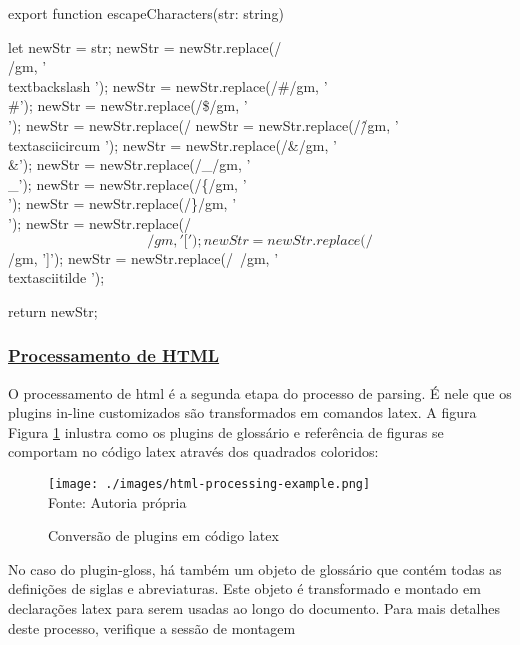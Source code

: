 \begin{codeEscape}
export function escapeCharacters(str: string){
    let newStr = str;
    newStr = newStr.replace(/\\/gm, '\\textbackslash ');
    newStr = newStr.replace(/#/gm, '\\#');
    newStr = newStr.replace(/\$/gm, '\\$$');
    newStr = newStr.replace(/%
    newStr = newStr.replace(/\^/gm, '\\textasciicircum ');
    newStr = newStr.replace(/&/gm, '\\&');
    newStr = newStr.replace(/_/gm, '\\_');
    newStr = newStr.replace(/\{/gm, '\\{');
    newStr = newStr.replace(/\}/gm, '\\}');
    newStr = newStr.replace(/\[/gm, '{[}');
    newStr = newStr.replace(/\]/gm, '{]}');
    newStr = newStr.replace(/~/gm, '\\textasciitilde ');

    return newStr;
}
\end{codeEscape}

\subsubsection{\underline{Processamento de HTML}}

O processamento de
\acrshort{html}
é a segunda etapa do processo de parsing. É
nele que os plugins in-line customizados são transformados
em comandos
\acrshort{latex}.
A figura
Figura \ref{fig:html-processing-example}
inlustra como os plugins de glossário e referência de figuras
se comportam no código
\acrshort{latex}
através dos quadrados coloridos:

\begin{figure}[H]
    \centering
    \caption{Conversão de plugins em código latex}
    \texttt{[image: ./images/html-processing-example.png]}
    \label{fig:html-processing-example} \\
    \textnormal{\fontsize{10pt}{12pt}Fonte: Autoria própria}
\end{figure}

No caso do plugin-gloss, há também um objeto de glossário que contém todas as definições
de siglas e abreviaturas. Este objeto é transformado e montado em declarações
\acrshort{latex}
para serem usadas ao longo do documento.
Para mais detalhes deste processo, verifique a sessão de montagem

